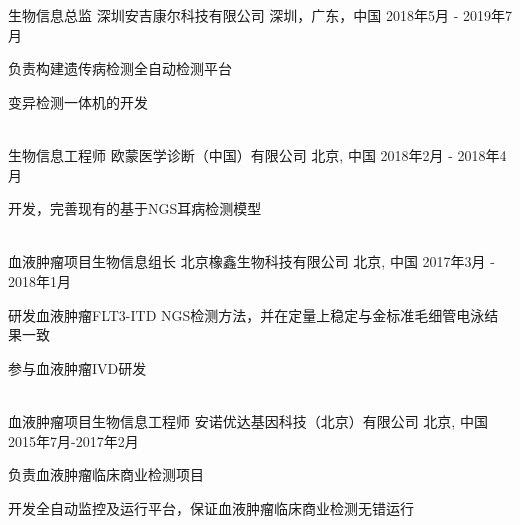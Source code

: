 

\begin{cventries}

  \cventry
    {生物信息总监} %
    {深圳安吉康尔科技有限公司} %
    {深圳，广东，中国} %
    {2018年5月 - 2019年7月} %
    {
      \begin{cvitems} %
        \item {负责构建遗传病检测全自动检测平台}
        \item {变异检测一体机的开发}
      \end{cvitems}
    }\\

  \cventry
    {生物信息工程师} %
    {欧蒙医学诊断（中国）有限公司} %
    {北京, 中国} %
    {2018年2月 - 2018年4月} %
    {
      \begin{cvitems} %
        \item {开发，完善现有的基于NGS耳病检测模型}
      \end{cvitems}
    } \\

  \cventry
    {血液肿瘤项目生物信息组长} %
    {北京橡鑫生物科技有限公司} %
    {北京, 中国} %
    {2017年3月 - 2018年1月} %
    {
      \begin{cvitems} %
        \item {研发血液肿瘤FLT3-ITD NGS检测方法，并在定量上稳定与金标准毛细管电泳结果一致}
        \item {参与血液肿瘤IVD研发}
      \end{cvitems}
    }\\

  \cventry
    {血液肿瘤项目生物信息工程师} %
    {安诺优达基因科技（北京）有限公司} %
    {北京, 中国} %
    {2015年7月-2017年2月} %
    {
      \begin{cvitems} %
        \item {负责血液肿瘤临床商业检测项目}
        \item {开发全自动监控及运行平台，保证血液肿瘤临床商业检测无错运行}
      \end{cvitems}
    }



\end{cventries}